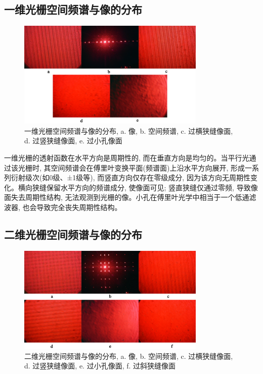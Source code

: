 \documentclass[12pt]{article}
\numberwithin{equation}{section}
\numberwithin{figure}{section}
\begin{document}
\subsection{一维光栅空间频谱与像的分布}

\begin{figure}[ht!]
    \centering
    \includegraphics[width=0.8\textwidth]{photos/1d-grating.png}
    \caption{\centering 一维光栅空间频谱与像的分布, a. 像, b. 空间频谱, c. 过横狭缝像面, d. 过竖狭缝像面, e. 过小孔像面}
    \label{fig:experiment3}
\end{figure}

一维光栅的透射函数在水平方向是周期性的, 而在垂直方向是均匀的。当平行光通过该光栅时, 其空间频谱会在傅里叶变换平面(频谱面)上沿水平方向展开, 形成一系列衍射级次(如0级、±1级等), 而竖直方向仅存在零级成分, 因为该方向无周期性变化。横向狭缝保留水平方向的频谱成分, 使像面可见; 竖直狭缝仅通过零频, 导致像面失去周期性结构, 无法观测到光栅的像。小孔在傅里叶光学中相当于一个低通滤波器, 也会导致完全丧失周期性结构。

\subsection{二维光栅空间频谱与像的分布}

\begin{figure}[ht!]
    \centering
    \includegraphics[width=0.8\textwidth]{photos/2d-grating.png}
    \caption{\centering 二维光栅空间频谱与像的分布, a. 像, b. 空间频谱, c. 过横狭缝像面, d. 过竖狭缝像面, e. 过小孔像面, f. 过斜狭缝像面}
    \label{fig:experiment4}
\end{figure}
\end{document}
